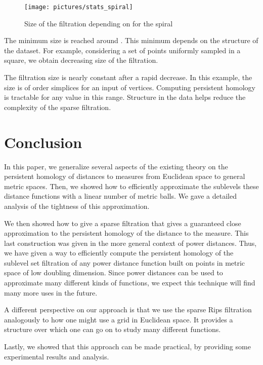 \documentclass[a4paper]{article}
\begin{document}
\begin{figure}[!ht]
\centering
\texttt{[image: pictures/stats\_spiral]}
\caption{Size of the filtration depending on  for the spiral}\label{fStatsSpiral}
\end{figure}

The minimum size is reached around .
This minimum depends on the structure of the dataset.
For example, considering a set of points uniformly sampled in a square, we obtain decreasing size of the filtration.

The filtration size is nearly constant after a rapid decrease. 
In this example, the size is of order  simplices for an input of  vertices.
Computing persistent homology is tractable for any value in this range.
Structure in the data helps reduce the complexity of the sparse filtration.



\section{Conclusion} \label{sec:conclusion}

  In this paper, we generalize several aspects of the existing theory on the persistent homology of distances to measures from Euclidean space to general metric spaces.
  Then, we showed how to efficiently approximate the sublevels these distance functions with a linear number of metric balls.
  We gave a detailed analysis of the tightness of this approximation.
  
  We then showed how to give a sparse filtration that gives a guaranteed close approximation to the persistent homology of the distance to the measure.
  This last construction was given in the more general context of power distances.
  Thus, we have given a way to efficiently compute the persistent homology of the sublevel set filtration of any power distance function built on points in metric space of low doubling dimension.
  Since power distances can be used to approximate many different kinds of functions, we expect this technique will find many more uses in the future.
  
  A different perspective on our approach is that we use the sparse Rips filtration analogously to how one might use a grid in Euclidean space.
  It provides a structure over which one can go on to study many different functions.
  
  Lastly, we showed that this approach can be made practical, by providing some experimental results and analysis.





\end{document}
